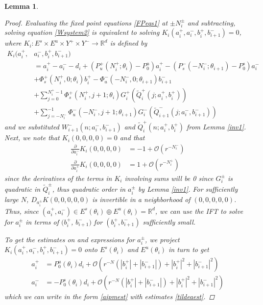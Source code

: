 \documentclass[12pt]{elsarticle}
\def\R{{\mathbb R}}
\newtheorem{lemma}{Lemma}
\begin{document}
\begin{lemma}
\begin{proof}
Evaluating the fixed point equations \eqref{FPeqs1} at $\pm N_i^\pm$ and subtracting, solving equation \eqref{Wsystem2} is equivalent to solving $K_i(a_i^+, a_i^-, b_i^+, b_{i+1}^-) = 0$, where $K_i: E^s \times E^u \times Y^+ \times Y^- \rightarrow \R^d$ is defined by
\begin{align*}
K_i(a_i^+, &a_i^-, b_i^+, b_{i+1}^-) \\
&= a_i^+ - a_i^- - d_i + (P_u^+(N_i^+; \theta_i) - P_0^u) a_i^+ - (P_s^-(-N_i^-; \theta_{i+1}) - P_0^s) a_i^- \\
&+ \Phi_s^+(N_i^+, 0; \theta_i) b_i^+ - \Phi_u^-(-N_i^-, 0; \theta_{i+1}) b_{i+1}^- \\
&+ \sum_{j = 0}^{N_i^+-1} \Phi_s^+(N_i^+, j+1; \theta_i) G_i^+(\tilde{Q}_i^+(j; a_i^+, b_i^+)) \\
&+ \sum_{j = -N_i^-}^{-1} \Phi_u^-(-N_i^-, j+1; \theta_{i+1}) G_i^-(\tilde{Q}_{i+1}^-(j; a_i^-, b_{i+1}^-))
\end{align*}
and we substituted $W_{i+1}^-(n; a_i^-, b_{i+1}^-)$ and $\tilde{Q}_i^+(n; a_i^+, b_i^+)$ from Lemma \ref{inv1}. Next, we note that $K_i(0,0,0,0) = 0$ and that 
\begin{align*}
\frac{\partial}{\partial a_i^-} K_i(0, 0, 0, 0) &= -1 + \mathcal{O}(r^{-N_i^-}) \\
\frac{\partial}{\partial a_i^+} K_i(0, 0, 0, 0) &= 1 + \mathcal{O}(r^{-N_i^+})
\end{align*}
since the derivatives of the terms in $K_i$ involving sums will be 0 since $G_i^\pm$ is quadratic in $\tilde{Q}_i^\pm$, thus quadratic order in $a_i^\pm$ by Lemma \ref{inv1}. For sufficiently large $N$, $D_{a_i^\pm} K(0, 0, 0, 0, 0)$ is invertible in a neighborhood of $(0, 0, 0, 0, 0)$. Thus, since $(a_i^+, a_i^-) \in E^s(\theta_i) \oplus E^u(\theta_i) = \R^d$, we can use the IFT to solve for $a_i^\pm$ in terms of $(b_i^+$, $b_{i+1}^-)$ for $(b_i^+, b_{i+1}^-)$ sufficiently small.

To get the estimates on and expressions for $a_i^\pm$, we project $K_i(a_i^+, a_i^-, b_i^+, b_{i+1}^-) = 0$ onto $E^s(\theta_i)$ and $E^u(\theta_i)$ in turn to get 
\begin{align*}
a_i^+ &= P_0^u(\theta_i) d_i + \mathcal{O}(r^{-N}(|b_i^+|+|b_{i+1}^-|) + |b_i^+|^2+|b_{i+1}^-|^2) \\
a_i^- &= -P_0^s(\theta_i) d_i + \mathcal{O}(r^{-N}(|b_i^+|+|b_{i+1}^-|) + |b_i^+|^2+|b_{i+1}^-|^2)
\end{align*}
which we can write in the form \eqref{aipmest} with estimates \eqref{tildeaest}. 


\end{proof}
\end{lemma}
\end{document}
